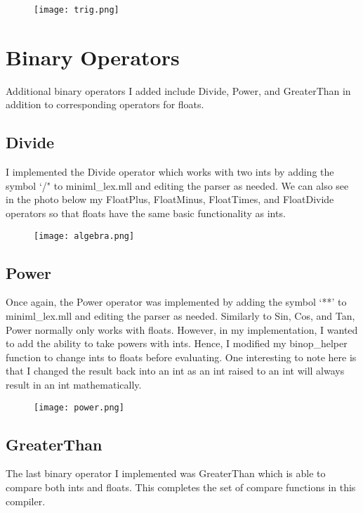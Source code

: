 \documentclass[12pt]{article}
\begin{document}
\begin{figure}[hbt]
    \centering
    \texttt{[image: trig.png]}
\end{figure}

\section{Binary Operators}

Additional binary operators I added include Divide, Power, and GreaterThan in addition to corresponding operators for floats.

\subsection*{Divide}
I implemented the Divide operator which works with two ints by adding the symbol `/" to miniml\_lex.mll and editing the parser as needed. We can also see in the photo below my FloatPlus, FloatMinus, FloatTimes, and FloatDivide operators so that floats have the same basic functionality as ints. 

\begin{figure}[hbt]
    \centering
    \texttt{[image: algebra.png]}
\end{figure}

\subsection*{Power}
Once again, the Power operator was implemented by adding the symbol `**' to miniml\_lex.mll and editing the parser as needed. Similarly to Sin, Cos, and Tan, Power normally only works with floats. However, in my implementation, I wanted to add the ability to take powers with ints. Hence, I modified my binop\_helper function to change ints to floats before evaluating. One interesting to note here is that I changed the result back into an int as an int raised to an int will always result in an int mathematically. 

\begin{figure}[hbt]
    \centering
    \texttt{[image: power.png]}
\end{figure}


\subsection*{GreaterThan}
The last binary operator I implemented was GreaterThan which is able to compare both ints and floats. This completes the set of compare functions in this compiler. 
\end{document}
